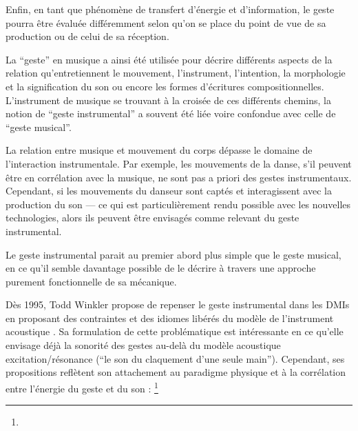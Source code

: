 \indent Enfin, en tant que phénomène de transfert d'énergie et d'information, le geste pourra être évaluée différemment selon qu'on se place du point de vue de sa production ou de celui de sa réception. 

La ``geste'' en musique a ainsi été utilisée pour décrire différents aspects de la relation qu'entretiennent le mouvement, l'instrument, l'intention, la morphologie et la signification du son ou encore les formes d'écritures compositionnelles. L'instrument de musique se trouvant à la croisée de ces différents chemins, la notion de ``geste instrumental'' a souvent été liée voire confondue avec celle de ``geste musical''. 

La relation entre musique et mouvement du corps dépasse le domaine de l'interaction instrumentale. Par exemple, les mouvements de la danse, s'il peuvent être en corrélation avec la musique, ne sont pas a priori des gestes instrumentaux. Cependant, si les mouvements du danseur sont captés et interagissent avec la production du son — ce qui est particulièrement rendu possible avec les nouvelles technologies, alors ils peuvent être envisagés comme relevant du geste instrumental.

Le geste instrumental parait au premier abord plus simple que le geste musical, en ce qu'il semble davantage possible de le décrire à travers une approche purement fonctionnelle de sa mécanique. 

Dès 1995, Todd Winkler propose de repenser le geste instrumental dans les \glspl{DMI} en proposant des contraintes et des idiomes libérés du modèle de l'instrument acoustique \cite{winkler_making_1995}. Sa formulation de cette problématique est intéressante en ce qu'elle envisage déjà la sonorité des gestes au-delà du modèle acoustique excitation/résonance (``le son du claquement d'une seule main''). Cependant, ses propositions reflètent son attachement au paradigme physique et à la corrélation entre l'énergie du geste et du son : \footnote{}





